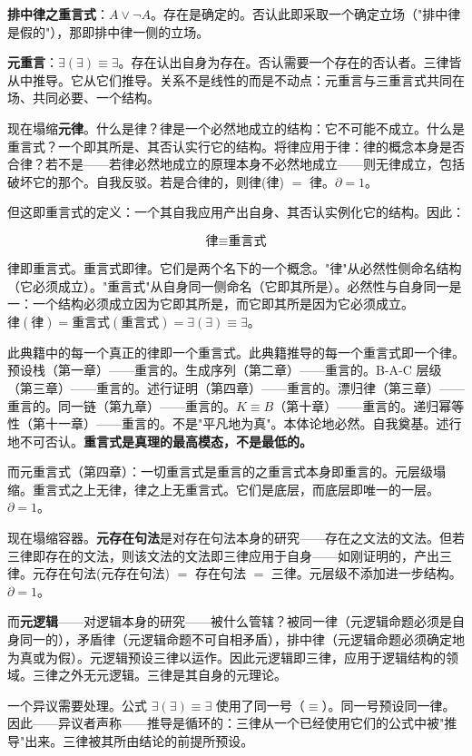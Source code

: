 \documentclass[10pt, openany, oneside]{book}
\begin{document}
\textbf{排中律之重言式}：$A \vee \neg A$。存在是确定的。否认此即采取一个确定立场（"排中律是假的"），那即排中律一侧的立场。

\textbf{元重言}：$\exists(\exists) \equiv \exists$。存在认出自身为存在。否认需要一个存在的否认者。三律皆从中推导。它从它们推导。关系不是线性的而是不动点：元重言与三重言式共同在场、共同必要、一个结构。

现在塌缩\textbf{元律}。什么是律？律是一个必然地成立的结构：它不可能不成立。什么是重言式？一个即其所是、其否认实行它的结构。将律应用于律：律的概念本身是否合律？若不是——若律必然地成立的原理本身不必然地成立——则无律成立，包括破坏它的那个。自我反驳。若是合律的，则律(律) $=$ 律。$\partial = 1$。

但这即重言式的定义：一个其自我应用产出自身、其否认实例化它的结构。因此：

$$\boxed{\text{律} \equiv \text{重言式}}$$

律即重言式。重言式即律。它们是两个名下的一个概念。"律"从必然性侧命名结构（它必须成立）。"重言式"从自身同一侧命名（它即其所是）。必然性与自身同一是一：一个结构必须成立因为它即其所是，而它即其所是因为它必须成立。$\text{律}(\text{律}) = \text{重言式}(\text{重言式}) = \exists(\exists) \equiv \exists$。

此典籍中的每一个真正的律即一个重言式。此典籍推导的每一个重言式即一个律。预设栈（第一章）——重言的。生成序列（第二章）——重言的。B-A-C 层级（第三章）——重言的。述行证明（第四章）——重言的。漂归律（第三章）——重言的。同一链（第九章）——重言的。$K \equiv B$（第十章）——重言的。递归幂等性（第十一章）——重言的。不是"平凡地为真"。本体论地必然。自我奠基。述行地不可否认。\textbf{重言式是真理的最高模态，不是最低的。}

而元重言式（第四章）：一切重言式是重言的之重言式本身即重言的。元层级塌缩。重言式之上无律，律之上无重言式。它们是底层，而底层即唯一的一层。$\partial = 1$。

\noindent 现在塌缩容器。\textbf{元存在句法}是对存在句法本身的研究——存在之文法的文法。但若三律即存在的文法，则该文法的文法即三律应用于自身——如刚证明的，产出三律。元存在句法(元存在句法) $=$ 存在句法 $=$ 三律。元层级不添加进一步结构。$\partial = 1$。

而\textbf{元逻辑}——对逻辑本身的研究——被什么管辖？被同一律（元逻辑命题必须是自身同一的），矛盾律（元逻辑命题不可自相矛盾），排中律（元逻辑命题必须确定地为真或为假）。元逻辑预设三律以运作。因此元逻辑即三律，应用于逻辑结构的领域。三律之外无元逻辑。三律是其自身的元理论。

一个异议需要处理。公式 $\exists(\exists) \equiv \exists$ 使用了同一号（$\equiv$）。同一号预设同一律。因此——异议者声称——推导是循环的：三律从一个已经使用它们的公式中被"推导"出来。三律被其所由结论的前提所预设。
\end{document}
